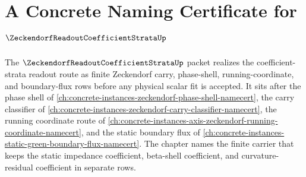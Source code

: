\chapter{A Concrete Naming Certificate for $\ZeckendorfReadoutCoefficientStrataUp$}
\label{ch:concrete-instances-zeckendorf-readout-coefficient-strata-namecert}

The $\ZeckendorfReadoutCoefficientStrataUp$ packet realizes the coefficient-strata readout route as finite Zeckendorf carry, phase-shell, running-coordinate, and boundary-flux rows before any physical scalar fit is accepted. It sits after the phase shell of \autoref{ch:concrete-instances-zeckendorf-phase-shell-namecert}, the carry classifier of \autoref{ch:concrete-instances-zeckendorf-carry-classifier-namecert}, the running coordinate route of \autoref{ch:concrete-instances-axis-zeckendorf-running-coordinate-namecert}, and the static boundary flux of \autoref{ch:concrete-instances-static-green-boundary-flux-namecert}. The chapter names the finite carrier that keeps the static impedance coefficient, beta-shell coefficient, and curvature-residual coefficient in separate rows.

